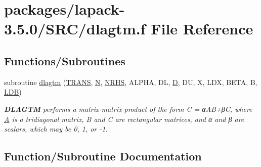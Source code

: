 \hypertarget{dlagtm_8f}{}\section{packages/lapack-\/3.5.0/\+S\+R\+C/dlagtm.f File Reference}
\label{dlagtm_8f}
\subsection*{Functions/\+Subroutines}
\begin{DoxyCompactItemize}
\item 
subroutine \hyperlink{dlagtm_8f_aef588ae9e76526cc89802086ae5eec11}{dlagtm} (\hyperlink{superlu__enum__consts_8h_a0c4e17b2d5cea33f9991ccc6a6678d62a1f61e3015bfe0f0c2c3fda4c5a0cdf58}{T\+R\+A\+N\+S}, \hyperlink{polmisc_8c_a0240ac851181b84ac374872dc5434ee4}{N}, \hyperlink{example__user_8c_aa0138da002ce2a90360df2f521eb3198}{N\+R\+H\+S}, A\+L\+P\+H\+A, D\+L, \hyperlink{odrpack_8h_a7dae6ea403d00f3687f24a874e67d139}{D}, D\+U, X, L\+D\+X, B\+E\+T\+A, B, \hyperlink{example__user_8c_a50e90a7104df172b5a89a06c47fcca04}{L\+D\+B})
\begin{DoxyCompactList}\small\item\em {\bfseries D\+L\+A\+G\+T\+M} performs a matrix-\/matrix product of the form C = α\+A\+B+β\+C, where \hyperlink{classA}{A} is a tridiagonal matrix, B and C are rectangular matrices, and α and β are scalars, which may be 0, 1, or -\/1. \end{DoxyCompactList}\end{DoxyCompactItemize}


\subsection{Function/\+Subroutine Documentation}
\hypertarget{dlagtm_8f_aef588ae9e76526cc89802086ae5eec11}{}
